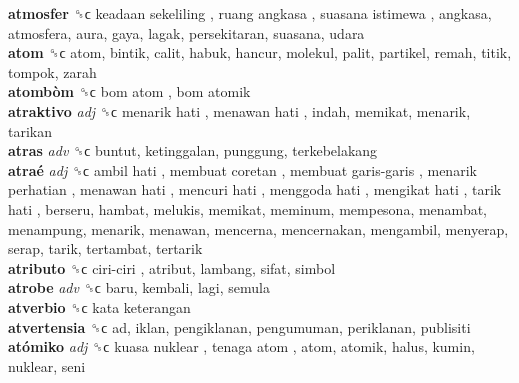 \textbf{atmosfer} ␝ϲ   keadaan sekeliling ,  ruang angkasa ,  suasana istimewa , angkasa, atmosfera, aura, gaya, lagak, persekitaran, suasana, udara  \\
\textbf{atom} ␝ϲ  atom, bintik, calit, habuk, hancur, molekul, palit, partikel, remah, titik, tompok, zarah  \\
\textbf{atombòm} ␝ϲ   bom atom ,  bom atomik   \\
\textbf{atraktivo} \emph{adj}  ␝ϲ   menarik hati ,  menawan hati , indah, memikat, menarik, tarikan  \\
\textbf{atras} \emph{adv}  ␝ϲ  buntut, ketinggalan, punggung, terkebelakang  \\
\textbf{atraé} \emph{adj}  ␝ϲ   ambil hati ,  membuat coretan ,  membuat garis-garis ,  menarik perhatian ,  menawan hati ,  mencuri hati ,  menggoda hati ,  mengikat hati ,  tarik hati , berseru, hambat, melukis, memikat, meminum, mempesona, menambat, menampung, menarik, menawan, mencerna, mencernakan, mengambil, menyerap, serap, tarik, tertambat, tertarik  \\
\textbf{atributo} ␝ϲ   ciri-ciri , atribut, lambang, sifat, simbol  \\
\textbf{atrobe} \emph{adv}  ␝ϲ  baru, kembali, lagi, semula  \\
\textbf{atverbio} ␝ϲ   kata keterangan   \\
\textbf{atvertensia} ␝ϲ  ad, iklan, pengiklanan, pengumuman, periklanan, publisiti  \\
\textbf{atómiko} \emph{adj}  ␝ϲ   kuasa nuklear ,  tenaga atom , atom, atomik, halus, kumin, nuklear, seni  \\
